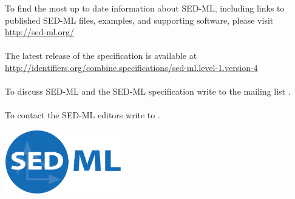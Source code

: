 \begin{titlepage}
\begin{center}
\normalsize
\begin{minipage}{5in}
\begin{center}
  To find the most up to date information about SED-ML, including links to published SED-ML files, examples, and supporting software, please visit
  \url{http://sed-ml.org/}

  \paragraph*{}
  The latest release of the \currentLV specification is available at
  \url{http://identifiers.org/combine.specifications/sed-ml.level-1.version-4}

  \paragraph*{}
  To discuss SED-ML and the SED-ML specification write to the mailing list .

  \paragraph*{}
  To contact the SED-ML editors write to .
\end{center}
\end{minipage}
\vfill


\centerline{\includegraphics[width=2in]{images/logoSedml.png}}

\end{center}

\end{titlepage}

%
%

\setcounter{page}{2}



